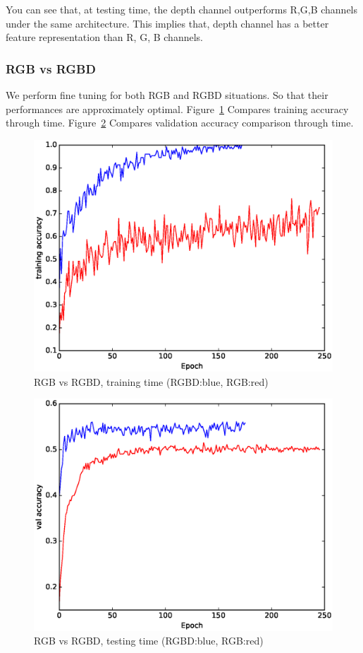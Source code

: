 \documentclass[journal]{IEEEtran}
\begin{document}
You can see that, at testing time, the depth channel outperforms R,G,B channels under the same architecture.
This implies that, depth channel has a better feature representation than R, G, B channels.

\subsubsection{RGB vs RGBD}
We perform fine tuning for both RGB and RGBD situations.
So that their performances are approximately optimal.
Figure~\ref{fig:mixtrain} Compares training accuracy  through time. 
Figure~\ref{fig:mixtest} Compares validation accuracy comparison through time. 
\begin{figure}
	\includegraphics[width=\linewidth]{../presentation/together_train.eps}
	\caption{RGB vs RGBD, training time (RGBD:blue, RGB:red)}
	\label{fig:mixtrain}
\end{figure}
\begin{figure}
	\includegraphics[width=\linewidth]{../presentation/together_test.eps}
	\caption{RGB vs RGBD, testing time (RGBD:blue, RGB:red)}
	\label{fig:mixtest}
\end{figure}
\end{document}
